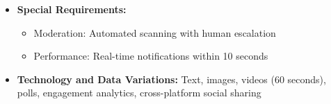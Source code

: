 \begin{itemize}
    \begin{itemize}
        \item 4a. Content flagged or policy violation: Post held for review with user feedback
        \item 6a. Group requires approval: Request sent to moderators
    \end{itemize}
    \item \textbf{Special Requirements:}
    \begin{itemize}
        \item Moderation: Automated scanning with human escalation
        \item Performance: Real-time notifications within 10 seconds
    \end{itemize}
    \item \textbf{Technology and Data Variations:} Text, images, videos (60 seconds), polls, engagement analytics, cross-platform social sharing
\end{itemize}

